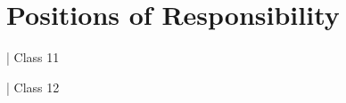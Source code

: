 \documentclass[]{deedy-resume-openfont}
\begin{document}
\sectionsep

%
%

\section{Positions of Responsibility}
\vspace{\topsep} %
\begin{large}
\begin{tightemize}
    \item {}| Class 11
    \item {}| Class 12
\end{tightemize}
\end{large}
\sectionsep
\end{document}
